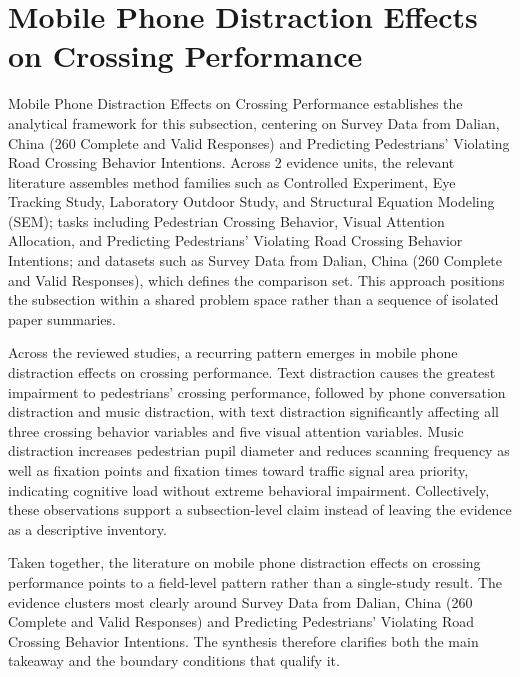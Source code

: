 \documentclass{article}
\begin{document}
\section{Mobile Phone Distraction Effects on Crossing Performance}
Mobile Phone Distraction Effects on Crossing Performance establishes the analytical framework for this subsection, centering on Survey Data from Dalian, China (260 Complete and Valid Responses) and Predicting Pedestrians' Violating Road Crossing Behavior Intentions. Across 2 evidence units, the relevant literature assembles method families such as Controlled Experiment, Eye Tracking Study, Laboratory Outdoor Study, and Structural Equation Modeling (SEM); tasks including Pedestrian Crossing Behavior, Visual Attention Allocation, and Predicting Pedestrians' Violating Road Crossing Behavior Intentions; and datasets such as Survey Data from Dalian, China (260 Complete and Valid Responses), which defines the comparison set. This approach positions the subsection within a shared problem space rather than a sequence of isolated paper summaries. \cite{09_2018_jiang_aap,08_2016_zhou_aap}

Across the reviewed studies, a recurring pattern emerges in mobile phone distraction effects on crossing performance. Text distraction causes the greatest impairment to pedestrians' crossing performance, followed by phone conversation distraction and music distraction, with text distraction significantly affecting all three crossing behavior variables and five visual attention variables. Music distraction increases pedestrian pupil diameter and reduces scanning frequency as well as fixation points and fixation times toward traffic signal area priority, indicating cognitive load without extreme behavioral impairment. Collectively, these observations support a subsection-level claim instead of leaving the evidence as a descriptive inventory. \cite{09_2018_jiang_aap,08_2016_zhou_aap}

Taken together, the literature on mobile phone distraction effects on crossing performance points to a field-level pattern rather than a single-study result. The evidence clusters most clearly around Survey Data from Dalian, China (260 Complete and Valid Responses) and Predicting Pedestrians' Violating Road Crossing Behavior Intentions. The synthesis therefore clarifies both the main takeaway and the boundary conditions that qualify it. \cite{09_2018_jiang_aap,08_2016_zhou_aap}
\end{document}
